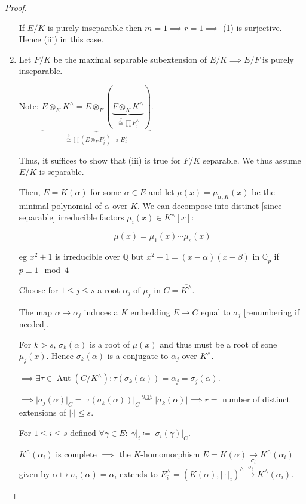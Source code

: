 \documentclass[openany]{amsbook}
\numberwithin{section}{chapter}
\theoremstyle{definition}
\begin{document}
\begin{proof}
\begin{enumerate}[label=\alph*)]
        If \(E / K\) is purely inseparable then \(m = 1 \implies r = 1 \implies\) (1) is surjective. Hence (iii) in this case.

        \item Let \(F / K\) be the maximal separable subextension of \(E / K \implies E / F\) is purely inseparable.
        
        Note: \(\underbrace{E \otimes_K K^\wedge = E \otimes_F (\underbrace{F \otimes _K K^\wedge}_{\overset{?}{\cong} \prod F_j^\wedge})}_{\overset{?}{\cong} \prod (E \otimes_F F_j^\wedge) \twoheadrightarrow E_j^\wedge}\).
        
        Thus, it suffices to show that (iii) is true for \(F / K\) separable. We thus assume \(E / K\) is separable.

        Then, \(E = K(\alpha)\) for some \(\alpha \in E\) and let \(\mu(x) = \mu_{\alpha , K}(x)\) be the minimal polynomial of \(\alpha\) over \(K\). We can decompose into distinct [since separable] irreducible factors \(\mu_i(x) \in K^\wedge[x]\):

        \[
            \mu(x) = \mu_1(x) \cdots \mu_s(x)
        \]

        eg \(x^2 + 1\) is irreducible over \(\mathbb{Q}\) but \(x^2 + 1 = (x-\alpha)(x-\beta)\) in \(\mathbb{Q}_p\) if \(p\equiv 1\mod 4\) 

        Choose for \(1 \leq j \leq s\) a root \(\alpha_j\) of \(\mu_j\) in \(C = \overline{K^\wedge}\).

        The map \(\alpha \mapsto \alpha_j\) induces a \(K\) embedding \(E \to C\) equal to \(\sigma_j\) [renumbering if needed].

        For \(k > s\), \(\sigma_k(\alpha)\) is a root of \(\mu(x)\) and thus must be a root of sone \(\mu_j (x)\). Hence \(\sigma_k(\alpha)\) is a conjugate to \(\alpha_j\) over \(K^\wedge\).
        
        \(\implies \exists \tau \in \operatorname{Aut}(C / K^\wedge): \tau (\sigma _k(\alpha)) = \alpha_j = \sigma_j(\alpha)\).

        \(\implies \vert \sigma_j(\alpha) \vert _C = \vert \tau(\sigma_k(\alpha)) \vert _C \overset{9.15}{=} \vert \sigma_k(\alpha) \vert \implies r = \) number of distinct extensions of \(\vert \cdot \vert \leq s\). 

        For \(1 \leq i \leq s\) defined \(\forall \gamma \in E: \vert \gamma \vert _i \coloneqq \vert \sigma_i (\gamma) \vert _C\).

        \(K^\wedge(\alpha_i)\) is complete \(\implies\) the \(K\)-homomorphism \(E = K(\alpha) \underset{\sigma_i}{\to} K^\wedge(\alpha_i)\) given by \(\alpha \mapsto \sigma_i(\alpha) = \alpha_i\) extends to \(E_i^\wedge = (K(\alpha), \vert \cdot \vert_i)^\wedge \overset{\hat{\sigma}_i}{\to}  K^\wedge(\alpha_i)\).
        

\end{enumerate}
\end{proof}
\end{document}
